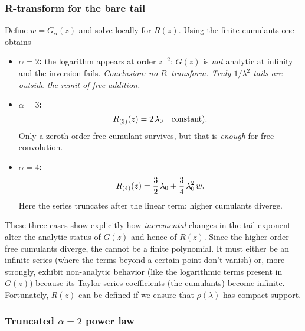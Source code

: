 \subsubsection{R-transform for the bare tail}
\label{sxn:RTransformExists:Rbare}

Define $w=G_{\alpha}(z)$ and solve locally for $R(z)$.  
Using the finite cumulants one obtains

\begin{itemize}
\item \textbf{$\alpha=2$:}  
  the logarithm appears at order $z^{-2}$; $G(z)$ is \emph{not} analytic at
  infinity and the inversion fails.  
  \emph{Conclusion: no $R$–transform.  Truly $1/\lambda^{2}$ tails are
  outside the remit of free addition.}

\item \textbf{$\alpha=3$:}
  \begin{equation}
  \label{eqn:RTransformExists_R3_final}
  R_{(3)}(z)=2\,\lambda_{0}
  \quad\text{constant}).
  \end{equation}
  Only a zeroth-order free cumulant survives, but that is \emph{enough}
  for free convolution.

\item \textbf{$\alpha=4$:}
  \begin{equation}
  \label{eqn:RTransformExists_R4_final}
  R_{(4)}(z)=\frac{3}{2}\,\lambda_{0}+
             \frac{3}{4}\,\lambda_{0}^{2}\,w.
  \end{equation}
  Here the series truncates after the linear term; higher cumulants
  diverge.
\end{itemize}

These three cases show explicitly how \emph{incremental} changes in the
tail exponent alter the analytic status of $G(z)$ and hence of $R(z)$. Since the  higher-order free cumulants diverge, the \RTransform cannot be a finite polynomial. It must either be an infinite series (where the terms beyond a certain point don't vanish) or, more strongly, exhibit non-analytic behavior (like the logarithmic terms present in $G(z)$) because its Taylor series coefficients (the cumulants) become infinite. Fortunately, $R(z)$ can be defined if we ensure that $\rho(\lambda)$ has compact support.
\subsubsection{Truncated \texorpdfstring{$\alpha=2$}{alpha=2} power law}
\label{sxn:RTransformExists:trunc2}

